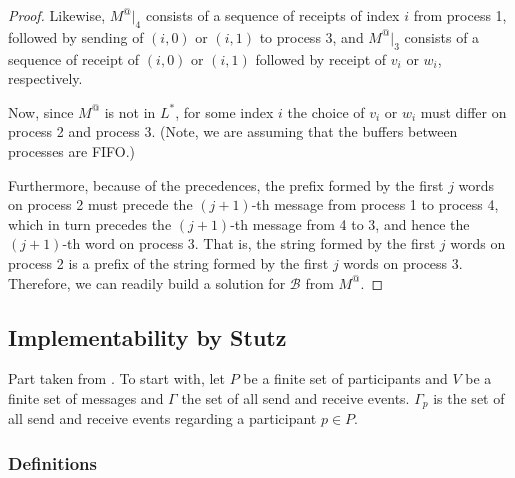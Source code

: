 \begin{proof}
Likewise, $M^@|_4$ consists of a sequence of receipts of index $i$ from
process 1, followed by sending of $(i, 0)$ or $(i, 1)$ to process 3, and
$M^@|_3$ consists of a sequence of receipt of $(i, 0)$ or $(i, 1)$ followed
by receipt of $v_i$ or $w_i$, respectively.

Now, since $M^@$ is not in $L^*$, for some index $i$ the choice of $v_i$ or
$w_i$ must differ on process 2 and process 3. (Note, we are assuming that
the buffers between processes are FIFO.)

Furthermore, because of the precedences, the prefix formed by the first
$j$ words on process 2 must precede the $(j + 1)$-th message from
process 1 to process 4, which in turn precedes the $(j + 1)$-th message
from 4 to 3, and hence the $(j + 1)$-th word on process 3. That is, the
string formed by the first $j$ words on process 2 is a prefix of the string
formed by the first $j$ words on process 3. Therefore, we can readily
build a solution for $\mathcal{B}$ from $M^@$.

\end{proof}

\subsection{Implementability by Stutz}

Part taken from \cite{stutz2024implementability}.
To start with, let $P$ be a finite set of participants and $V$ be a finite set of messages
and $\Gamma$ the set of all send and receive events. $\Gamma_p$ is the set of all send and receive events
regarding a participant $p\in P$.

\subsubsection{Definitions}

